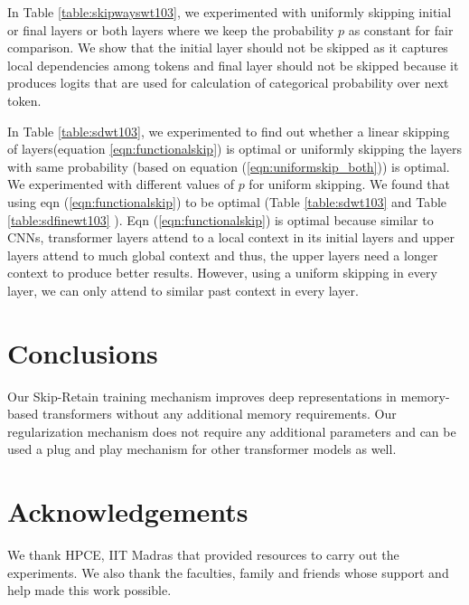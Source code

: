 \documentclass[11pt]{article}
\begin{document}
In Table \ref{table:skipwayswt103}, we experimented with uniformly skipping initial or final layers or both layers where we keep the probability $p$ as constant for fair comparison. We show that the initial layer should not be skipped as it captures local dependencies among tokens and final layer should not be skipped because it produces logits that are used for calculation of categorical probability over next token.


In Table \ref{table:sdwt103}, we experimented to find out whether a linear skipping of layers(equation \ref{eqn:functionalskip}) is optimal or uniformly skipping the layers with same probability (based on equation (\ref{eqn:uniformskip_both})) is optimal. We experimented with different values of $p$ for uniform skipping.
We found that using eqn (\ref{eqn:functionalskip}) to be optimal (Table \ref{table:sdwt103} and Table \ref{table:sdfinewt103} ). Eqn (\ref{eqn:functionalskip}) is optimal because similar to CNNs, transformer layers attend to a local context in its initial layers and upper layers attend to much global context and thus, the upper layers need a longer context to produce better results. However, using a uniform skipping in every layer, we can only attend to similar past context in every layer.



\section{Conclusions}


Our Skip-Retain training mechanism improves deep representations in memory-based transformers without any additional memory requirements. Our regularization mechanism does not require any additional parameters and can be used a plug and play mechanism for other transformer models as well. 


















\section*{Acknowledgements}

We thank HPCE, IIT Madras that provided resources to carry out the experiments. We also thank the faculties, family and friends whose support and help made this work possible.
\end{document}
